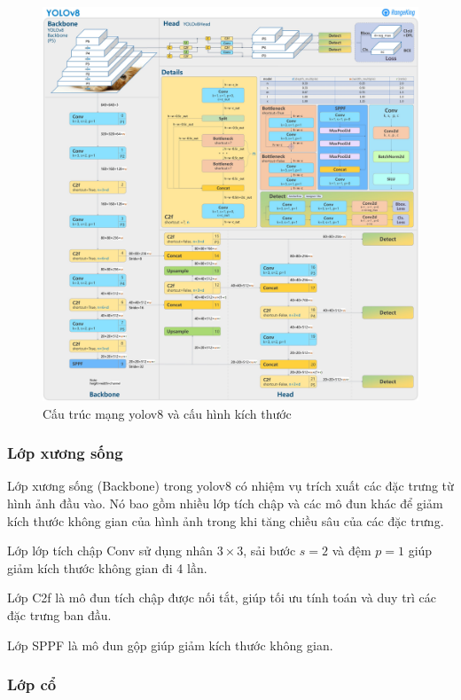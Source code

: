 \begin{figure}[h]
	\centering
	\includegraphics[width=1\linewidth]{images/yolov8-network.png}
	\caption{Cấu trúc mạng \acrshort{yolo}v8 và cấu hình kích thước}
	\label{fig:yolov8-structure}
\end{figure}

\subsubsection{Lớp xương sống}

Lớp xương sống (Backbone) trong \acrshort{yolo}v8 có nhiệm vụ trích xuất các đặc trưng từ hình ảnh đầu vào. Nó bao gồm nhiều lớp tích chập và các mô đun khác để giảm kích thước không gian của hình ảnh trong khi tăng chiều sâu của các đặc trưng.

Lớp lớp tích chập Conv sử dụng nhân $3\times3$, sải bước $s=2$ và đệm $p = 1$ giúp giảm kích thước không gian đi 4 lần.

Lớp C2f là mô đun tích chập được nối tắt, giúp tối ưu tính toán và duy trì các đặc trưng ban đầu.

Lớp SPPF là mô đun gộp giúp giảm kích thước không gian.

\subsubsection{Lớp cổ}

